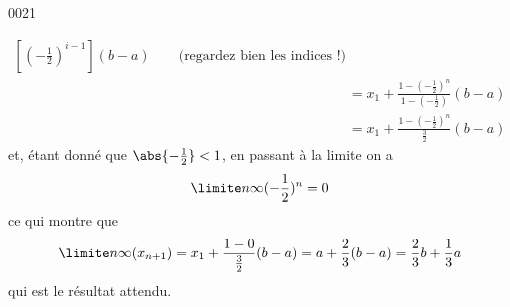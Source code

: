 \begin{corrige}{0021}
\begin{enumerate}
\begin{equation*}
\begin{split}
      \left[{\left(-\frac12\right)}^{i-1}\right] (b-a)
      \qquad\text{(regardez bien les indices !)}\\
      &= x_1 + \frac{1 - (-\frac12)^n}{1 - (-\frac12)} (b-a)\\
      &= x_1 + \frac{1 - (-\frac12)^n}{\frac32} (b-a)
    \end{split}
  \end{equation*}
  et, étant donné que $\abs{-\frac12} < 1$, en passant à la limite on
  a
  \begin{equation*}
    \limite n \infty (-\frac12)^n = 0
  \end{equation*}
  ce qui montre que
  \begin{equation*}
    \limite n\infty (x_{n+1}) = x_1 + \frac{1 - 0}{\frac32} (b-a) = a +
    \frac23 (b-a) = \frac23 b + \frac13 a
  \end{equation*}
  qui est le résultat attendu.
\end{enumerate}


\end{corrige}
